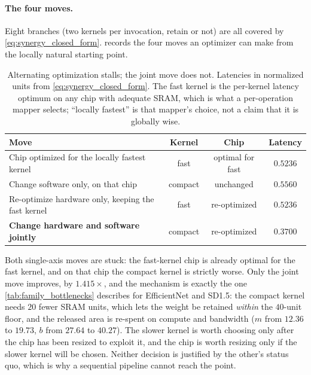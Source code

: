\paragraph{The four moves.}
Eight branches (two kernels per invocation, retain or not) are all covered by
\cref{eq:synergy_closed_form}.  records the four moves an
optimizer can make from the locally natural starting point.

\begin{table}[ht!]
\centering
\small
\caption{Alternating optimization stalls; the joint move does not. Latencies in
normalized units from \cref{eq:synergy_closed_form}. The fast kernel is the
per-kernel latency optimum on any chip with adequate SRAM, which is what a
per-operation mapper selects; ``locally fastest'' is that mapper's choice, not
a claim that it is globally wise.}
\label{tab:synergy_moves}
\begin{tabular}{@{}lccc@{}}
\toprule
\textbf{Move} & \textbf{Kernel} & \textbf{Chip} & \textbf{Latency} \\
\midrule
Chip optimized for the locally fastest kernel & fast & optimal for fast & $0.5236$ \\
Change software only, on that chip & compact & unchanged & $0.5560$ \\
Re-optimize hardware only, keeping the fast kernel & fast & re-optimized & $0.5236$ \\
\textbf{Change hardware and software jointly} & compact & re-optimized & $\mathbf{0.3700}$ \\
\bottomrule
\end{tabular}
\end{table}

Both single-axis moves are stuck: the fast-kernel chip is already optimal for
the fast kernel, and on that chip the compact kernel is strictly worse. Only the
joint move improves, by $1.415\times$, and the mechanism is exactly the one
\cref{tab:family_bottlenecks} describes for EfficientNet and SD1.5: the compact
kernel needs $20$ fewer SRAM units, which lets the weight be retained
\emph{within} the $40$-unit floor, and the released area is re-spent on compute
and bandwidth ($m$ from $12.36$ to $19.73$, $b$ from $27.64$ to $40.27$). The
slower kernel is worth choosing only after the chip has been resized to exploit
it, and the chip is worth resizing only if the slower kernel will be chosen.
Neither decision is justified by the other's status quo, which is why a
sequential pipeline cannot reach the point.

